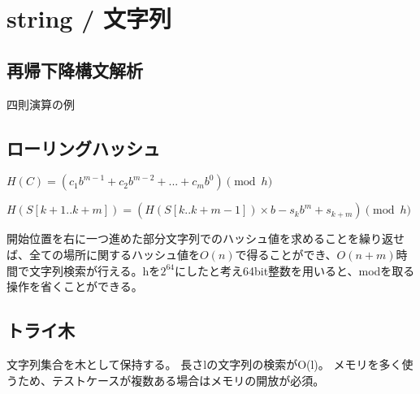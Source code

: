 \section{string / 文字列}

\subsection{再帰下降構文解析}
四則演算の例


\subsection{ローリングハッシュ}
$H(C)=(c_1b^{m-1}+c_2b^{m-2}+...+c_mb^0)\pmod h $

$H(S[k+1..k+m])=(H(S[k..k+m-1])\times b-s_kb^m+s_{k+m})\pmod h$

開始位置を右に一つ進めた部分文字列でのハッシュ値を求めることを繰り返せば、全ての場所に関するハッシュ値を$O(n)$で得ることができ、$O(n+m)$時間で文字列検索が行える。hを$2^{64}$にしたと考え64bit整数を用いると、modを取る操作を省くことができる。



\subsection{トライ木}
文字列集合を木として保持する。
長さlの文字列の検索がO(l)。
メモリを多く使うため、テストケースが複数ある場合はメモリの開放が必須。

